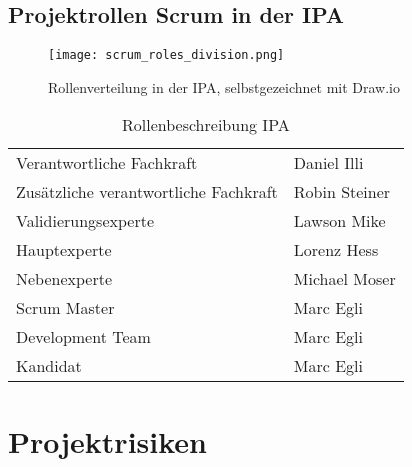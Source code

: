 \newpage

\section{Projektrollen Scrum in der IPA}

\begin{figure}[h]
    \centering
    \texttt{[image: scrum\_roles\_division.png]}
    \caption{Rollenverteilung in der IPA, selbstgezeichnet mit Draw.io}
\end{figure}

\begin{table}[h!]
    \begin{tabular}{|L{0.4\textwidth}|L{0.5\textwidth}|}
        \hline
          \\[12pt]
        \hline
        Verantwortliche Fachkraft & Daniel Illi  \\
        \hline
        Zusätzliche verantwortliche Fachkraft & Robin Steiner \\
        \hline
        Validierungsexperte & Lawson Mike \\ 
        \hline
        Hauptexperte & Lorenz Hess \\ 
        \hline
        Nebenexperte & Michael Moser \\ 
        \hline
        Scrum Master & Marc Egli \\ 
        \hline
        Development Team & Marc Egli \\ 
        \hline
        Kandidat & Marc Egli \\ 
        \hline
      \end{tabular}
      \caption{Rollenbeschreibung IPA}
\end{table}

\newpage

\storeareas\riskvaluesproject
{}
\areaset
  {\dimexpr\the\paperwidth-1cm\relax}
  {\dimexpr\the\paperheight-5.5cm\relax}
\recalctypearea

\chapter{Projektrisiken}

